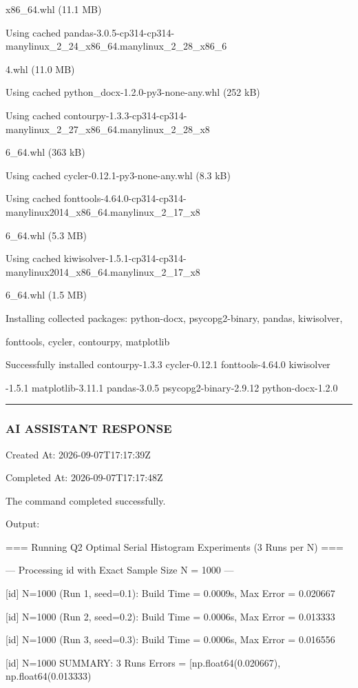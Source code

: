 \documentclass[11pt,a4paper]{article}
\begin{document}
x86\_64.whl (11.1 MB)

Using cached pandas-3.0.5-cp314-cp314-manylinux\_2\_24\_x86\_64.manylinux\_2\_28\_x86\_6

4.whl (11.0 MB)

Using cached python\_docx-1.2.0-py3-none-any.whl (252 kB)

Using cached contourpy-1.3.3-cp314-cp314-manylinux\_2\_27\_x86\_64.manylinux\_2\_28\_x8

6\_64.whl (363 kB)

Using cached cycler-0.12.1-py3-none-any.whl (8.3 kB)

Using cached fonttools-4.64.0-cp314-cp314-manylinux2014\_x86\_64.manylinux\_2\_17\_x8

6\_64.whl (5.3 MB)

Using cached kiwisolver-1.5.1-cp314-cp314-manylinux2014\_x86\_64.manylinux\_2\_17\_x8

6\_64.whl (1.5 MB)

Installing collected packages: python-docx, psycopg2-binary, pandas, kiwisolver,

fonttools, cycler, contourpy, matplotlib


Successfully installed contourpy-1.3.3 cycler-0.12.1 fonttools-4.64.0 kiwisolver

-1.5.1 matplotlib-3.11.1 pandas-3.0.5 psycopg2-binary-2.9.12 python-docx-1.2.0


\hrule

\subsubsection{AI ASSISTANT RESPONSE}

Created At: 2026-09-07T17:17:39Z

Completed At: 2026-09-07T17:17:48Z


The command completed successfully.

Output:

=== Running Q2 Optimal Serial Histogram Experiments (3 Runs per N) ===


--- Processing id with Exact Sample Size N = 1000 ---

[id] N=1000 (Run 1, seed=0.1): Build Time = 0.0009s, Max Error = 0.020667

[id] N=1000 (Run 2, seed=0.2): Build Time = 0.0006s, Max Error = 0.013333

[id] N=1000 (Run 3, seed=0.3): Build Time = 0.0006s, Max Error = 0.016556

[id] N=1000 SUMMARY: 3 Runs Errors = [np.float64(0.020667), np.float64(0.013333)
\end{document}
